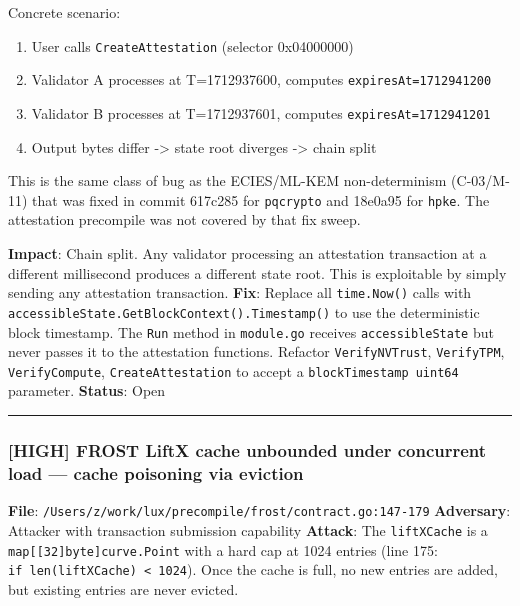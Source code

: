 \documentclass[
]{article}
\providecommand{\tightlist}{%
  \setlength{\itemsep}{0pt}\setlength{\parskip}{0pt}}
\begin{document}
Concrete scenario:

\begin{enumerate}
\def\labelenumi{\arabic{enumi}.}
\tightlist
\item
  User calls \texttt{CreateAttestation} (selector 0x04000000)
\item
  Validator A processes at T=1712937600, computes
  \texttt{expiresAt=1712941200}
\item
  Validator B processes at T=1712937601, computes
  \texttt{expiresAt=1712941201}
\item
  Output bytes differ -\textgreater{} state root diverges
  -\textgreater{} chain split
\end{enumerate}

This is the same class of bug as the ECIES/ML-KEM non-determinism
(C-03/M-11) that was fixed in commit 617c285 for \texttt{pqcrypto} and
18e0a95 for \texttt{hpke}. The attestation precompile was not covered by
that fix sweep.

\textbf{Impact}: Chain split. Any validator processing an attestation
transaction at a different millisecond produces a different state root.
This is exploitable by simply sending any attestation transaction.
\textbf{Fix}: Replace all \texttt{time.Now()} calls with
\texttt{accessibleState.GetBlockContext().Timestamp()} to use the
deterministic block timestamp. The \texttt{Run} method in
\texttt{module.go} receives \texttt{accessibleState} but never passes it
to the attestation functions. Refactor \texttt{VerifyNVTrust},
\texttt{VerifyTPM}, \texttt{VerifyCompute}, \texttt{CreateAttestation}
to accept a \texttt{blockTimestamp\ uint64} parameter. \textbf{Status}:
Open

\begin{center}\rule{0.5\linewidth}{0.5pt}\end{center}

\subsubsection{{[}HIGH{]} FROST LiftX cache unbounded under concurrent
load --- cache poisoning via
eviction}\label{high-frost-liftx-cache-unbounded-under-concurrent-load--cache-poisoning-via-eviction}

\textbf{File}:
\texttt{/Users/z/work/lux/precompile/frost/contract.go:147-179}
\textbf{Adversary}: Attacker with transaction submission capability
\textbf{Attack}: The \texttt{liftXCache} is a
\texttt{map{[}{[}32{]}byte{]}curve.Point} with a hard cap at 1024
entries (line 175: \texttt{if\ len(liftXCache)\ \textless{}\ 1024}).
Once the cache is full, no new entries are added, but existing entries
are never evicted.
\end{document}
